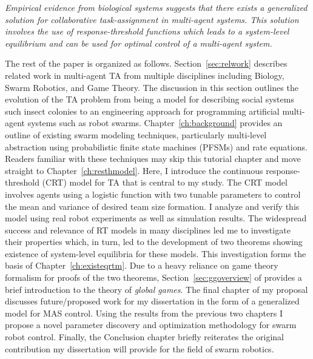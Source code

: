 \documentclass[defaultstyle,12pt]{proposal}
\begin{document}
\emph{Empirical evidence from biological systems suggests that there exists a generalized solution for collaborative task-assignment in multi-agent systems. This solution involves the use of response-threshold functions which leads to a system-level equilibrium and can be used for optimal control of a multi-agent system.}

The rest of the paper is organized as follows. Section~\ref{sec:relwork} describes related work in multi-agent TA from multiple disciplines including Biology, Swarm Robotics, and Game Theory. The discussion in this section outlines the evolution of the TA problem from being a model  for describing social systems such insect colonies to an engineering approach for programming artificial multi-agent systems such as robot swarms. Chapter~\ref{ch:background} provides an outline of existing swarm modeling techniques, particularly multi-level abstraction using probabilistic finite state machines (PFSMs) and rate equations. Readers familiar with these techniques may skip this tutorial chapter and move straight to Chapter~\ref{ch:resthmodel}. Here, I introduce the continuous response-threshold (CRT) model for TA that is central to my study. The CRT model involves agents using a logistic function with two tunable parameters to control the mean and variance of desired team size formation. I analyze and verify this model using real robot experiments as well as simulation results. The widespread success and relevance of RT models in many disciplines led me to investigate their properties which, in turn, led to the development of two theorems showing existence of system-level equilibria for these models. This investigation forms the basis of Chapter~\ref{ch:existeqrtm}. Due to a heavy reliance on game theory formalism for proofs of the two theorems, Section~\ref{sec:ggoverview} of provides a brief introduction to the theory of \emph{global games}. The final chapter of my proposal discusses future/proposed work for my dissertation in the form of a generalized model for MAS control. Using the results from the previous two chapters I propose a novel parameter discovery and optimization methodology for swarm robot control. Finally, the Conclusion chapter briefly reiterates the original contribution my dissertation will provide for the field of swarm robotics.
\end{document}
